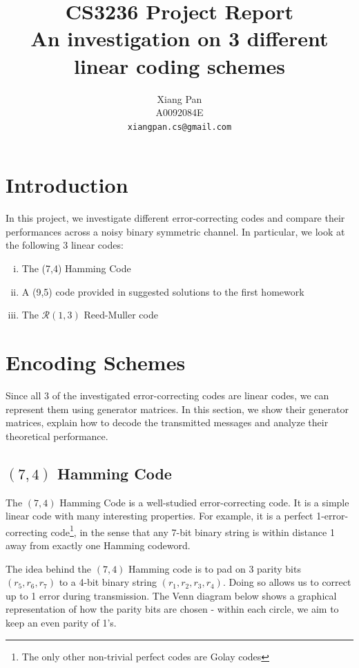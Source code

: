 \documentclass[12pt, a4paper]{article}
\begin{document}
\title{CS3236 Project Report\\ An investigation on 3 different linear coding schemes}
\author{Xiang Pan \\ A0092084E \\ \texttt{xiangpan.cs@gmail.com}}
\date{} %
\maketitle

\section{Introduction}
In this project, we investigate different error-correcting codes and compare their performances across a noisy binary symmetric channel. In particular, we look at the following 3 linear codes:
\begin{enumerate}[(i)]
\item The (7,4) Hamming Code
\item A (9,5) code provided in suggested solutions to the first homework
\item The $\mathcal{R}(1,3)$ Reed-Muller code
\end{enumerate}

\section{Encoding Schemes}
Since all 3 of the investigated error-correcting codes are linear codes, we can represent them using generator matrices. In this section, we show their generator matrices, explain how to decode the transmitted messages and analyze their theoretical performance.

\subsection{$(7,4)$ Hamming Code}
The $(7,4)$ Hamming Code is a well-studied error-correcting code. It is a simple linear code with many interesting properties. For example, it is a perfect 1-error-correcting code\footnote{The only other non-trivial perfect codes are Golay codes}, in the sense that any 7-bit binary string is within distance 1 away from exactly one Hamming codeword.

The idea behind the $(7,4)$ Hamming code is to pad on 3 parity bits $(r_5, r_6, r_7)$ to a 4-bit binary string $(r_1, r_2, r_3, r_4)$. Doing so allows us to correct up to 1 error during transmission. The Venn diagram below shows a graphical representation of how the parity bits are chosen - within each circle, we aim to keep an even parity of 1's.
\end{document}
